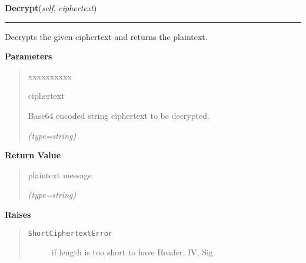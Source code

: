     \label{keyczar:keyczar:Crypter:Decrypt}

    \vspace{0.5ex}

\hspace{.8\funcindent}\begin{boxedminipage}{\funcwidth}

    \raggedright \textbf{Decrypt}(\textit{self}, \textit{ciphertext})

    \vspace{-1.5ex}

    \rule{\textwidth}{0.5\fboxrule}
\setlength{\parskip}{2ex}
    Decrypts the given ciphertext and returns the plaintext.

\setlength{\parskip}{1ex}
      \textbf{Parameters}
      \vspace{-1ex}

      \begin{quote}
        \begin{Ventry}{xxxxxxxxxx}

          \item[ciphertext]

          Base64 encoded string ciphertext to be decrypted.

            {\it (type=string)}

        \end{Ventry}

      \end{quote}

      \textbf{Return Value}
    \vspace{-1ex}

      \begin{quote}
      plaintext message

      {\it (type=string)}

      \end{quote}

      \textbf{Raises}
    \vspace{-1ex}

      \begin{quote}
        \begin{description}

          \item[\texttt{ShortCiphertextError}]

          if length is too short to have Header, IV, Sig


\end{description}
\end{quote}
\end{boxedminipage}
